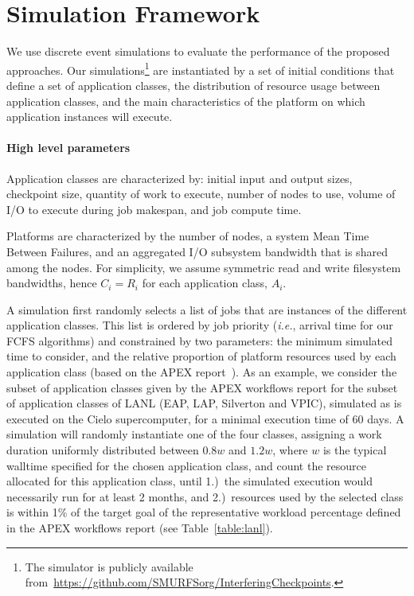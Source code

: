 \documentclass[two]{article}
\newcommand{\ie}[0]{\emph{i.e.}\xspace}
\newcommand{\app}[1]{A_{#1}}
\newcommand{\ckpt}[1]{C_{#1}}
\newcommand{\reco}[1]{R_{#1}}
\begin{document}
\section{Simulation Framework}
\label{sec:simulator}

We use discrete event simulations to evaluate the performance of the proposed
approaches.  Our simulations\footnote{The simulator is publicly available
from~\url{https://github.com/SMURFSorg/InterferingCheckpoints}.} are instantiated
by a set of initial conditions that define a set of application classes, the
distribution of resource usage between application classes, and the main
characteristics of the platform on which application instances will execute.

\paragraph*{High level parameters}
Application classes are characterized by: initial input and output sizes, checkpoint
size, quantity of work to execute, number of nodes to use, volume of I/O to
execute during job makespan, and job compute time.

Platforms are characterized by the number of nodes, a system Mean Time
Between Failures, and an aggregated I/O subsystem bandwidth that is shared among the
nodes. For simplicity, we assume symmetric read and write filesystem bandwidths, hence
$\ckpt{i}=\reco{i}$ for each application class, $\app{i}$.

A simulation first randomly selects a list of jobs that are instances
of the different application classes. This list is ordered by job
priority (\ie, arrival time for our FCFS algorithms) and constrained
by two parameters: the minimum simulated time to consider, and the
relative proportion of platform resources used by each application
class (based on the APEX report~\cite{apex2016}).  As an example, we
consider the subset of application classes given by the APEX workflows
report for the subset of application classes of LANL (EAP, LAP,
Silverton and VPIC), simulated as is executed on the Cielo
supercomputer, for a minimal execution time of 60 days. A simulation
will randomly instantiate one of the four classes, assigning a work
duration uniformly distributed between $0.8w$ and $1.2w$, where $w$ is
the typical walltime specified for the chosen application class, and
count the resource allocated for this application class, until 1.)~the
simulated execution would necessarily run for at least 2 months, and
2.)~resources used by the selected class is within 1\% of the target
goal of the representative workload percentage defined in the APEX
workflows report (see Table~\ref{table:lanl}).
\end{document}
